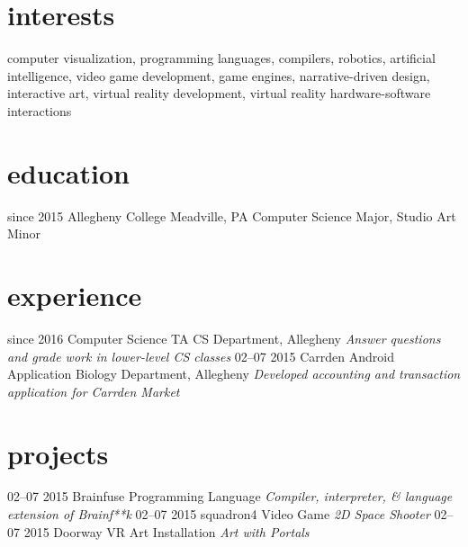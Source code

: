 \documentclass[]{friggeri-cv}
\begin{document}
\section{interests}

computer visualization, programming languages, compilers, robotics, artificial intelligence, video game development, game engines,  narrative-driven design, interactive art, virtual reality development, virtual reality hardware-software interactions

\section{education}

\begin{entrylist}
  \entry
    {since 2015}
    {Allegheny College}
    {Meadville, PA}
    {Computer Science Major, Studio Art Minor}
\end{entrylist}

\section{experience}

\begin{entrylist}
  \entry
    {since 2016}
    {Computer Science TA}
    {CS Department, Allegheny}
    {\emph{Answer questions and grade work in lower-level CS classes}}
  \entry
    {02–07 2015}
    {Carrden Android Application}
    {Biology Department, Allegheny}
    {\emph{Developed accounting and transaction application for Carrden Market}}
\end{entrylist}

\section{projects}

\begin{entrylist}
  \entry
    {02–07 2015}
    {Brainfuse}
    {Programming Language}
    {\emph{Compiler, interpreter, \& language extension of Brainf**k}}
  \entry
    {02–07 2015}
    {squadron4}
    {Video Game}
    {\emph{2D Space Shooter}}
  \entry
    {02–07 2015}
    {Doorway}
    {VR Art Installation}
    {\emph{Art with Portals}}
\end{entrylist}
\end{document}
